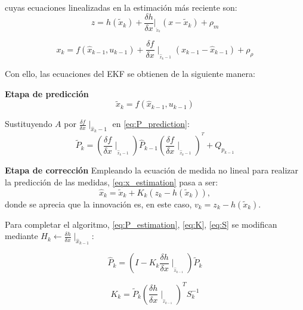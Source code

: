 cuyas ecuaciones linealizadas en la estimación más reciente son:
\begin{equation}\label{eq:medida_linealizada}
    z = h(\tilde{x}_{k})+\frac{\delta h}{\delta x}|_{ _{\tilde{x}_k}} (x-\tilde{x}_{k})+\rho_{m}
\end{equation}

\begin{equation}\label{eq:estado_linealizada}
    x_{k} = f(\hat{x}_{k-1},u_{k-1})+\frac{\delta f}{\delta x}\mid _{_{\hat{x}_k-1}} (x_{k-1}-\hat{x}_{k-1})+\rho_{\rho}
\end{equation}

Con ello, las ecuaciones del EKF se obtienen de la siguiente manera:


\textbf{Etapa de predicción}
\begin{equation}\label{eq:x_predictionEKF}
    \tilde{x}_{k} = f(\hat{x}_{k-1},u_{k-1})
\end{equation}

Sustituyendo $A$ por $\frac{\delta f}{\delta x}\mid _{\hat{x}_k-1}$ en \ref{eq:P_prediction}:
\begin{equation}\label{eq:P_predictionEKF}
    \tilde{P}_{k} = (\frac{\delta f}{\delta x}\mid_{ _{\hat{x}_k-1}}) \hat{P}_{k-1} (\frac{\delta f}{\delta x}\mid_{ _{\hat{x}_k-1}})^{^{T}}+Q_{p_{k-1}}
\end{equation}


\textbf{Etapa de corrección}
Empleando la ecuación de medida no lineal para realizar la predicción de las medidas, \ref{eq:x_estimation} pasa a ser:
\begin{equation}\label{eq:x_estimationEKF}
    \hat{x}_{k} = \tilde{x}_{k}+K_{k}(z_{k}-h(\tilde{x}_{k})),
\end{equation}
donde se aprecia que la innovación es, en este caso, $v_{k} = z_{k}-h(\tilde{x}_{k})$.

Para completar el algoritmo,  \ref{eq:P_estimation}, \ref{eq:K}, \ref{eq:S} se modifican mediante $H_{k}\leftarrow \frac{\delta h}{\delta x}\mid_{\hat{x}_{k-1}}$:

\begin{equation}\label{eq:P_estimationEKF}
    \hat{P}_{k} = (I-K_{k}\frac{\delta h}{\delta x}\mid _{_{\hat{x}_{k-1}}})\tilde{P}_{k}
\end{equation}

\begin{equation}\label{eq:KEKF}
    K_{k} = \tilde{P}_{k}(\frac{\delta h}{\delta x}\mid _{_{\hat{x}_{k-1}}})^{T}S_{k}^{-1}
\end{equation}

